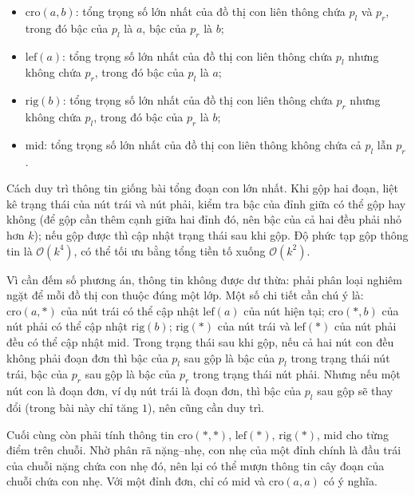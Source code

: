 \documentclass[11pt]{article}
\newcommand{\Oh}{\mathcal{O}}
\begin{document}
\begin{itemize}
  \item \(\mathrm{cro}(a,b)\): tổng trọng số lớn nhất của đồ thị con liên
  thông chứa \(p_l\) và \(p_r\), trong đó bậc của \(p_l\) là \(a\), bậc của
  \(p_r\) là \(b\);

  \item \(\mathrm{lef}(a)\): tổng trọng số lớn nhất của đồ thị con liên thông
  chứa \(p_l\) nhưng không chứa \(p_r\), trong đó bậc của \(p_l\) là \(a\);

  \item \(\mathrm{rig}(b)\): tổng trọng số lớn nhất của đồ thị con liên thông
  chứa \(p_r\) nhưng không chứa \(p_l\), trong đó bậc của \(p_r\) là \(b\);

  \item \(\mathrm{mid}\): tổng trọng số lớn nhất của đồ thị con liên thông
  không chứa cả \(p_l\) lẫn \(p_r\).
\end{itemize}

Cách duy trì thông tin giống bài tổng đoạn con lớn nhất. Khi gộp hai đoạn,
liệt kê trạng thái của nút trái và nút phải, kiểm tra bậc của đỉnh giữa có thể
gộp hay không (để gộp cần thêm cạnh giữa hai đỉnh đó, nên bậc của cả hai đều
phải nhỏ hơn \(k\)); nếu gộp được thì cập nhật trạng thái sau khi gộp. Độ phức
tạp gộp thông tin là \(\Oh(k^4)\), có thể tối ưu bằng tổng tiền tố xuống
\(\Oh(k^2)\).

Vì cần đếm số phương án, thông tin không được dư thừa: phải phân loại nghiêm
ngặt để mỗi đồ thị con thuộc đúng một lớp. Một số chi tiết cần chú ý là:
\(\mathrm{cro}(a,*)\) của nút trái có thể cập nhật \(\mathrm{lef}(a)\) của nút
hiện tại; \(\mathrm{cro}(*,b)\) của nút phải có thể cập nhật
\(\mathrm{rig}(b)\); \(\mathrm{rig}(*)\) của nút trái và \(\mathrm{lef}(*)\)
của nút phải đều có thể cập nhật \(\mathrm{mid}\). Trong trạng thái sau khi
gộp, nếu cả hai nút con đều không phải đoạn đơn thì bậc của \(p_l\) sau gộp là
bậc của \(p_l\) trong trạng thái nút trái, bậc của \(p_r\) sau gộp là bậc của
\(p_r\) trong trạng thái nút phải. Nhưng nếu một nút con là đoạn đơn, ví dụ
nút trái là đoạn đơn, thì bậc của \(p_l\) sau gộp sẽ thay đổi (trong bài này
chỉ tăng \(1\)), nên cũng cần duy trì.

Cuối cùng còn phải tính thông tin \(\mathrm{cro}(*,*)\), \(\mathrm{lef}(*)\),
\(\mathrm{rig}(*)\), \(\mathrm{mid}\) cho từng điểm trên chuỗi. Nhờ phân rã
nặng--nhẹ, con nhẹ của một đỉnh chính là đầu trái của chuỗi nặng chứa con nhẹ
đó, nên lại có thể mượn thông tin cây đoạn của chuỗi chứa con nhẹ. Với một
đỉnh đơn, chỉ có \(\mathrm{mid}\) và \(\mathrm{cro}(a,a)\) có ý nghĩa.
\end{document}
